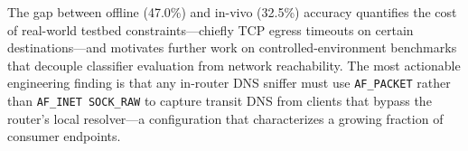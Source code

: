 \documentclass[journal,onecolumn]{IEEEtran}
\begin{document}
The gap between offline (47.0\%) and in-vivo (32.5\%) accuracy
quantifies the cost of real-world testbed constraints—chiefly TCP
egress timeouts on certain destinations—and motivates further work on
controlled-environment benchmarks that decouple classifier evaluation
from network reachability. The most actionable engineering finding is
that any in-router DNS sniffer must use \texttt{AF\_PACKET} rather
than \texttt{AF\_INET SOCK\_RAW} to capture transit DNS from clients
that bypass the router's local resolver—a configuration that
characterizes a growing fraction of consumer endpoints.



\end{document}
